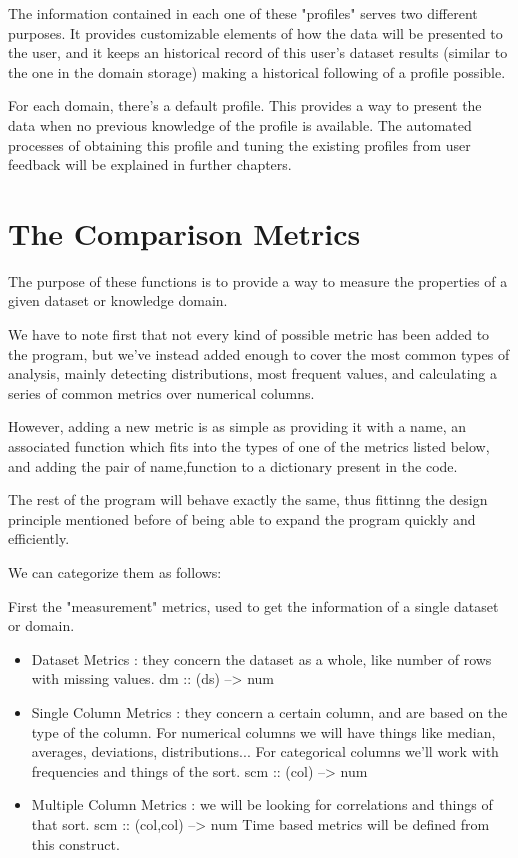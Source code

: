 The information contained in each one of these "profiles" serves two different purposes. It provides customizable elements of  how  the data will be presented to the user, and it keeps an historical record of this user's dataset results (similar to the one in the domain storage) making a historical following of a profile possible.

For each domain, there's a default profile. This provides a way to present the data when no previous knowledge of the profile is available. The automated processes of obtaining this profile and tuning the existing profiles from user feedback will be explained in further chapters.

\section{The Comparison Metrics}
\label{cap3:sec:metrics}

The purpose of these functions is to provide a way to measure the properties of a given dataset or knowledge domain.

We have to note first that not every kind of possible metric has been added to the program, but we've instead added enough to cover the most common types of analysis, mainly detecting distributions, most frequent values, and calculating a series of common metrics over numerical columns.

However, adding a new metric is as simple as providing it with a name, an associated function which fits into the types of one of the metrics listed below, and adding the pair of name,function to a dictionary present in the code.

The rest of the program will behave exactly the same, thus fittinng the design principle mentioned before of being able to expand the program quickly and efficiently.

We can categorize them as follows:

First the "measurement" metrics, used to get the information of a single dataset or domain.
\begin{itemize}
\item Dataset Metrics : they concern the dataset as a whole, like number of rows with missing values.
    dm :: (ds) --> num
    
\item Single Column Metrics : they concern a certain column, and are based on the type of the column.
    For numerical columns we will have things like median, averages, deviations, distributions...
    For categorical columns we'll work with frequencies and things of the sort.
    scm :: (col) --> num
    
\item Multiple Column Metrics : we will be looking for correlations and things of that sort.
    scm :: (col,col) --> num 
    Time based metrics will be defined from this construct.
\end{itemize}


